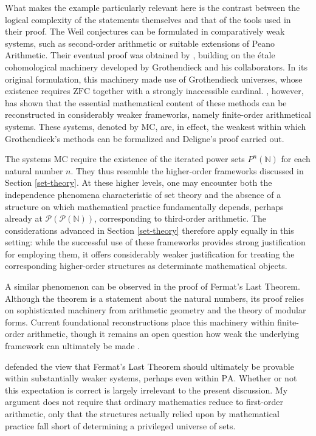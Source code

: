 \documentclass[11pt,a4paper]{article}
\begin{document}
What makes the example particularly relevant here is the contrast between the logical complexity of the statements themselves and that of the tools used in their proof. The Weil conjectures can be formulated in comparatively weak systems, such as second-order arithmetic or suitable extensions of Peano Arithmetic. Their eventual proof was obtained by \textcite{Deligne1974}, building on the étale cohomological machinery developed by Grothendieck and his collaborators. In its original formulation, this machinery made use of Grothendieck universes, whose existence requires $\mathrm{ZFC}$ together with a strongly inaccessible cardinal. \textcite{McLarty2020}, however, has shown that the essential mathematical content of these methods can be reconstructed in considerably weaker frameworks, namely finite-order arithmetical systems. These systems, denoted by $\mathrm{MC}$, are, in effect, the weakest within which Grothendieck's methods can be formalized and Deligne's proof carried out.

The systems $\mathrm{MC}$ require the existence of the iterated power sets $P^n(\mathbb N)$ for each natural number $n$. They thus resemble the higher-order frameworks discussed in Section \ref{set-theory}. At these higher levels, one may encounter both the independence phenomena characteristic of set theory and the absence of a structure on which mathematical practice fundamentally depends, perhaps already at $\mathcal{P}(\mathcal{P}(\mathbb N))$, corresponding to third-order arithmetic. The considerations advanced in Section \ref{set-theory} therefore apply equally in this setting: while the successful use of these frameworks provides strong justification for employing them, it offers considerably weaker justification for treating the corresponding higher-order structures as determinate mathematical objects.

A similar phenomenon can be observed in the proof of Fermat's Last Theorem. Although the theorem is a statement about the natural numbers, its proof relies on sophisticated machinery from arithmetic geometry and the theory of modular forms. Current foundational reconstructions place this machinery within finite-order arithmetic, though it remains an open question how weak the underlying framework can ultimately be made \parencite[17]{McLarty2020}. 

\textcite{Feferman1999} defended the view that Fermat's Last Theorem should ultimately be provable within substantially weaker systems, perhaps even within $\mathrm{PA}$. Whether or not this expectation is correct is largely irrelevant to the present discussion. My argument does not require that ordinary mathematics reduce to first-order arithmetic, only that the structures actually relied upon by mathematical practice fall short of determining a privileged universe of sets.
\end{document}

